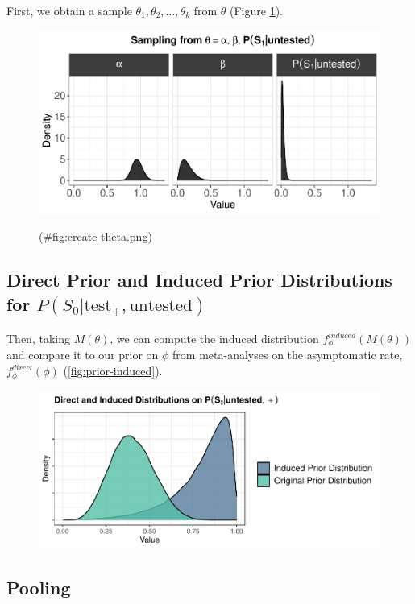 \documentclass[12pt,twoside]{smiththesis}
\begin{document}
First, we obtain a sample \(\theta_1, \theta_2, \dots, \theta_k\) from \(\theta\) (Figure \ref{fig:theta}).
\begin{figure}

{\centering \includegraphics[width=1\linewidth]{thesis_files/figure-latex/create theta.png-1} 

}

\caption{\label{fig:theta}}(\#fig:create theta.png)
\end{figure}
\hypertarget{direct-prior-and-induced-prior-distributions-for-ps_0texttest_textuntested}{%
\subsection{\texorpdfstring{Direct Prior and Induced Prior Distributions for \(P(S_0|\text{test}_+,\text{untested})\)}{Direct Prior and Induced Prior Distributions for P(S\_0\textbar\textbackslash text\{test\}\_+,\textbackslash text\{untested\})}}\label{direct-prior-and-induced-prior-distributions-for-ps_0texttest_textuntested}}

Then, taking \(M(\theta)\), we can compute the induced distribution \(f_\phi^{induced}(M(\theta))\) and compare it to our prior on \(\phi\) from meta-analyses on the asymptomatic rate, \(f_\phi^{direct}(\phi)\) (\ref{fig:prior-induced}).
\begin{figure}

{\centering \includegraphics[width=1\linewidth]{thesis_files/figure-latex/unnamed-chunk-19-1} 

}

\caption{\label{fig:prior-induced}}\label{fig:unnamed-chunk-19}
\end{figure}
\hypertarget{pooling}{%
\subsection{Pooling}\label{pooling}}
\end{document}
